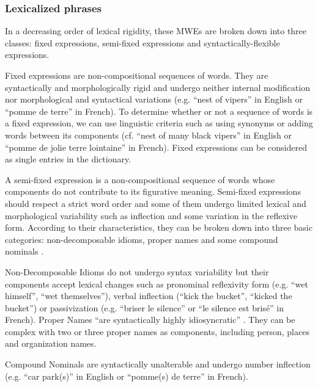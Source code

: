 \documentclass[output=paper,modfonts,nonflat]{langsci/langscibook}
\begin{document}
\subsubsection{Lexicalized phrases}
In a decreasing order of lexical rigidity, these MWEs are broken down into three classes: fixed expressions, semi-fixed expressions and syntactically-flexible expressions.

Fixed expressions are non-compositional sequences of words.
They are syntactically and morphologically rigid and undergo neither internal modification nor morphological and syntactical variations (e.g. ``nest of vipers'' in English or ``pom\-me de terre'' in  French).
To determine whether or not a sequence of words is a fixed expression, we can use linguistic criteria such as using synonyms or adding words between its components (cf. ``nest of many black vipers'' in English or ``pomme de jolie terre lointaine'' in French).
Fixed expressions can be considered as single entries in the dictionary.

A semi-fixed expression is a non-compositional sequence of words whose components do not contribute to its figurative meaning.
Semi-fixed expressions should respect a strict word order and some of them undergo limited lexical and morphological variability such as inflection and some variation in the reflexive form.
According to their characteristics, they can be broken down into three basic categories: non-decomposable idioms, proper names and some compound nominals \citep{sag02}.

Non-Decomposable Idioms do not undergo syntax variability but their components accept lexical changes such as pronominal reflexivity form (e.g. ``wet himself'', ``wet themselves''), verbal inflection (``kick the bucket'', ``kicked the bucket'') or passivization (e.g. ``briser le silence'' or  ``le silence est brisé'' in French).
Proper Names ``are syntactically highly idiosyncratic'' \citep{sag02}.
They can be complex with two or three proper names as components, including person, places and organization names.

Compound Nominals are syntactically unalterable and undergo number inflection (e.g. ``car park(s)'' in English or ``pomme(s) de terre'' in French).

\end{document}
